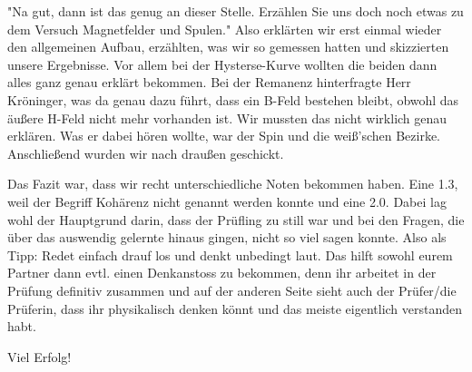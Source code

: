 "Na gut, dann ist das genug an dieser Stelle. Erzählen Sie uns doch noch etwas zu dem Versuch Magnetfelder und Spulen." 
Also erklärten wir erst einmal wieder den allgemeinen Aufbau, erzählten, was wir so gemessen hatten und skizzierten unsere Ergebnisse. 
Vor allem bei der Hysterse-Kurve wollten die beiden dann alles ganz genau erklärt bekommen. Bei der Remanenz hinterfragte Herr Kröninger, 
was da genau dazu führt, dass ein B-Feld bestehen bleibt, obwohl das äußere H-Feld nicht mehr vorhanden ist. Wir mussten das nicht wirklich 
genau erklären. Was er dabei hören wollte, war der Spin und die weiß'schen Bezirke. Anschließend wurden wir nach draußen geschickt.

Das Fazit war, dass wir recht unterschiedliche Noten bekommen haben. Eine 1.3, weil der Begriff Kohärenz nicht genannt werden konnte und eine 2.0. Dabei lag wohl der Hauptgrund darin, dass der Prüfling zu still war und bei den Fragen, die über das auswendig gelernte hinaus gingen, nicht so viel sagen konnte. 
Also als Tipp: Redet einfach drauf los und denkt unbedingt laut. Das hilft sowohl eurem Partner dann evtl. einen Denkanstoss zu bekommen, denn ihr arbeitet in der Prüfung definitiv zusammen und auf der anderen Seite sieht auch der Prüfer/die Prüferin, dass ihr physikalisch denken könnt und das meiste eigentlich verstanden habt.

Viel Erfolg! 
